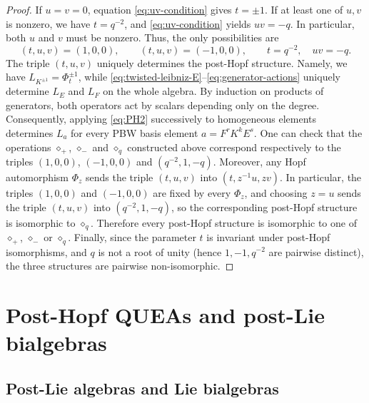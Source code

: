 \documentclass[11pt,english]{article}
\newcommand{\act}{\mathbin{\diamond}}
\theoremstyle{definition}
\begin{document}
\begin{proof}
If $u=v=0$, equation \eqref{eq:uv-condition}
gives $t=\pm1$. If at least one of $u,v$
is nonzero, we have $t=q^{-2}$, and
\eqref{eq:uv-condition} yields $uv=-q$.
In particular, both $u$ and $v$ must
be nonzero. Thus, the only possibilities are
\begin{equation}\label{eq:cases}
(t,u,v)=(1,0,0),\qquad
(t,u,v)=(-1,0,0),\qquad
t=q^{-2},\quad uv=-q.
\end{equation}
The triple $(t,u,v)$ uniquely determines the
post-Hopf structure. Namely, we have
$L_{K^{\pm1}}=\Phi_t^{\pm1}$, while
\eqref{eq:twisted-leibniz-E}--\eqref{eq:generator-actions} uniquely determine $L_E$ and
$L_F$ on the whole algebra. By induction on
products of generators, both operators act
by scalars depending only on the degree.
Consequently, applying \eqref{eq:PH2}
successively to homogeneous elements
determines $L_a$ for every PBW basis
element $a=F^rK^kE^s$.
One can check that the operations
$\act_+$, $\act_-$ and $\act_q$
constructed above correspond respectively
to the triples
$(1,0,0)$, $(-1,0,0)$ and
$(q^{-2},1,-q)$.
Moreover, 
any Hopf automorphism $\Phi_z$ sends
the triple $(t,u,v)$ into
$(t,z^{-1}u,zv)$.
In particular, the triples $(1,0,0)$
and $(-1,0,0)$ are fixed by every
$\Phi_z$, and choosing $z=u$
sends the triple $(t,u,v)$ into $(q^{-2},1,-q)$,
so the corresponding post-Hopf structure
is isomorphic to $\act_q$.
Therefore every post-Hopf structure is
isomorphic to one of
$\act_+$, $\act_-$ or $\act_q$. 
Finally, since the parameter $t$ is invariant
under post-Hopf isomorphisms, and $q$ is not a root of unity (hence
$1,-1,q^{-2}$ are pairwise distinct), the three structures are pairwise
non-isomorphic.
\end{proof}

\section{Post-Hopf QUEAs and post-Lie bialgebras}

\subsection{Post-Lie algebras and Lie bialgebras}
\label{subsec:post-lie}
\end{document}
